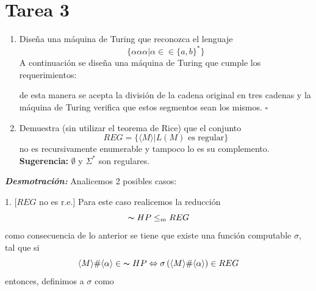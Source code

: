 \documentclass{article}
\begin{document}
\section*{\LARGE{Tarea 3}}
\begin{enumerate}
\item Diseña una máquina de Turing que reconozca el lenguaje
  \[
  \{\alpha\alpha\alpha \big| \alpha \in \in\{a, b\}^*\}
  \]
  A continuación se diseña una máquina de Turing que cumple los
  requerimientos:
  \begin{center}
  \end{center}
      de esta manera se acepta la división de la cadena original en tres cadenas y la máquina de Turing verifica que estos segmentos
    sean los mismos. \hfill $\square$
\item Demuestra (sin utilizar el teorema de Rice) que el conjunto
  \[
  REG = \{\langle M \rangle \big| L(M) \text{ es regular}\}
  \]
  no es recursivamente enumerable y tampoco lo es su complemento.
  \textbf{Sugerencia:} $\emptyset$ y $\Sigma^*$ son regulares.
\end{enumerate}
  
\textbf{\textit{Desmotración:}} Analicemos 2 posibles casos:

1. [$REG$ no es r.e.] Para este caso realicemos la reducción 
\[
\thicksim HP \leq_{m} REG
\]
como consecuencia de lo anterior se tiene que existe una función computable
$\sigma$, tal que si
\[
\langle M \rangle \# \langle \alpha \rangle \in\; \thicksim HP
\Leftrightarrow \sigma\left(\langle M \rangle \# \langle \alpha \rangle\right) \in REG
\]
entonces, definimos a $\sigma$ como
\end{document}
